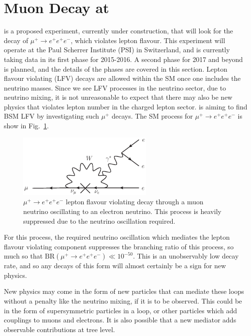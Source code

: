 \section{Muon Decay at \mueee}
\label{sec:mu3e_experiment}
\mueee \cite{Blondel:2013ia} is a proposed experiment, currently under construction, that will look for the decay of $\mu^+ \rightarrow e^+ e^+ e^-$, which violates lepton flavour.
This experiment will operate at the Paul Scherrer Institute (PSI) in Switzerland, and is currently taking data in its first phase for 2015-2016.
A second phase for 2017 and beyond is planned, and the details of the phases are covered in this section. 
Lepton flavour violating (LFV) decays are allowed within the SM once one includes the neutrino masses.
Since we see LFV processes in the neutrino sector, due to neutrino mixing, it is not unreasonable to expect that there may also be new physics that violates lepton number in the charged lepton sector.
\mueee is aiming to find BSM LFV by investigating such $\mu^+$ decays.
The SM process for $\mu^+ \rightarrow e^+ e^+ e^-$ is show in Fig.\ \ref{fig:mu_eee_SM}.
\begin{figure}[h]
    \centering
    \includegraphics[width = 0.6\textwidth]{Figures/feynman_diagrams/mu_eee_SM.eps}
    \caption{$\mu^+ \rightarrow e^+ e^+ e^-$ lepton flavour violating decay through a muon neutrino oscillating to an electron neutrino. This process is heavily suppressed due to the neutrino oscillation required.}
    \label{fig:mu_eee_SM}
\end{figure}
For this process, the required neutrino oscillation which mediates the lepton flavour violating component suppresses the branching ratio of this process, so much so that $\textrm{BR}(\mu^+ \rightarrow e^+ e^+ e^-) \ll 10^{-50}$.
This is an unobservably low decay rate, and so any decays of this form will almost certainly be a sign for new physics.

New physics may come in the form of new particles that can mediate these loops without a penalty like the neutrino mixing, if it is to be observed.
This could be in the form of supersymmetric particles in a loop, or other particles which add couplings to muons and electrons.
It is also possible that a new mediator adds observable contributions at tree level.

